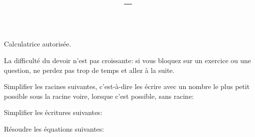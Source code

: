\documentclass[a4paper,12pt]{scrartcl}
\date{}
\title{\typedevoir{} -- \classe{}\writecorrword{}}
\begin{document}
\maketitle


Calculatrice autorisée. 

La difficulté du devoir n'est pas croissante: si vous bloquez sur un exercice ou une question, ne perdez pas trop de temps et allez à la suite.

Simplifier les racines suivantes, c'est-à-dire les écrire avec un nombre le plus petit possible sous la racine voire, lorsque c'est possible, sans racine:










Simplifier les écritures suivantes:










Résoudre les équations suivantes:








\end{document}
